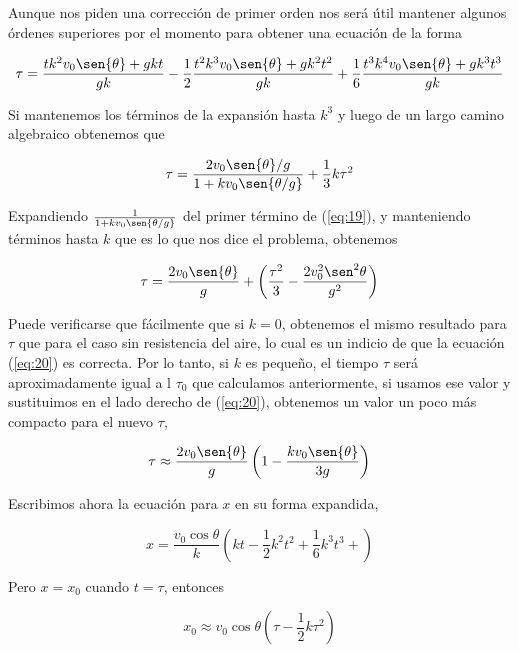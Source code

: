 \documentclass[a4paper,10pt]{article}
\numberwithin{equation}{section}
\begin{document}
Aunque nos piden una corrección de primer orden nos será útil mantener
algunos órdenes superiores por el momento para obtener una ecuación de la 
forma

\begin{equation}
 \tau = \frac{tk^2 v_0 \sen{\theta}+gkt}{gk} - \frac{1}{2} \frac{t^2k^3 v_0 \sen{\theta}+gk^2t^2}{gk} + 
 \frac{1}{6} \frac{t^3k^4 v_0 \sen{\theta}+gk^3t^3}{gk}
\end{equation}

Si mantenemos los términos de la expansión hasta $k^3$ y luego de un largo
camino algebraico obtenemos que

\begin{equation}
 \tau = \frac{2 v_0 \sen{\theta} /g}{1+k v_0 \sen{\theta / g}} + \frac{1}{3} k \tau^2
 \label{eq:19}
\end{equation}

Expandiendo $\frac{1}{1+k v_0 \sen{\theta / g}}$ del primer término de
(\ref{eq:19}), y manteniendo términos hasta $k$ que es lo que nos dice
el problema, obtenemos 

\begin{equation}
  \tau = \frac{2 v_0 \sen{\theta}}{g}+\left(\frac{\tau^2}{3} - \frac{2 v_0^2 \sen^2{\theta}}{g^2} \right)
  \label{eq:20}
\end{equation}

Puede verificarse que fácilmente que si $k=0$, obtenemos el mismo resultado
para $\tau$ que para el caso sin resistencia del aire, lo cual es un indicio
de que la ecuación (\ref{eq:20}) es correcta. Por lo tanto, si $k$ es
pequeño, el tiempo $\tau$ será aproximadamente igual a l $\tau_0$ que
calculamos anteriormente, si usamos ese valor y sustituimos en el
lado derecho de (\ref{eq:20}), obtenemos un valor un poco más compacto
para el nuevo $\tau$,

\begin{equation}
 \tau \approx \frac{2 v_0 \sen{\theta}}{g}\left(1 - \frac{k v_0 \sen{\theta}}{3g} \right)
 \label{eq:21}
\end{equation}

Escribimos ahora la ecuación para $x$ en su forma expandida,

\begin{equation}
 x = \frac{v_0 \cos{\theta}}{k}\left(kt - \frac{1}{2}k^2t^2 + \frac{1}{6}k^3t^3  + \right)
\end{equation}

Pero $x = x_0$ cuando $t = \tau$, entonces 

\begin{equation}
 x_0 \approx v_0 \cos{\theta}\left(\tau - \frac{1}{2} k \tau^2 \right)
 \label{eq:22}
\end{equation}
\end{document}
